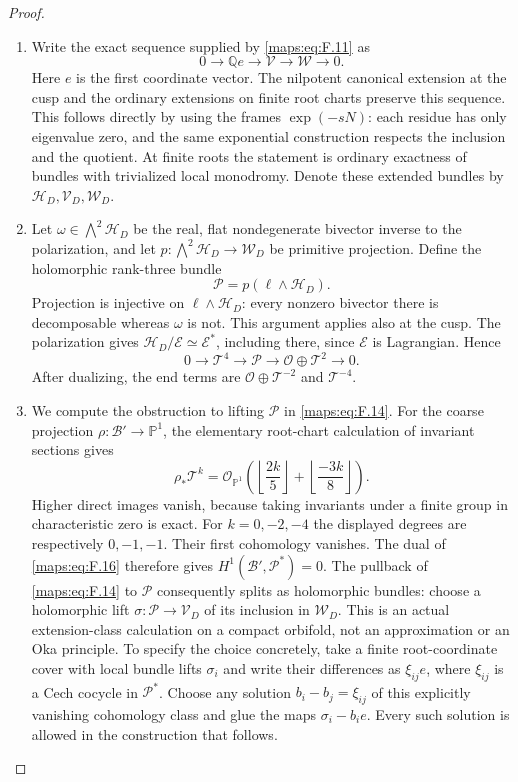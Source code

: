 \documentclass[11pt,a4paper]{article}
\theoremstyle{definition}
\begin{document}
\begin{proof}
\begin{enumerate}[label=\arabic*.]
\item Write the exact sequence supplied by \eqref{maps:eq:F.11} as
\[
 0\longrightarrow\mathbb Q e\longrightarrow\mathcal V
   \longrightarrow\mathcal W\longrightarrow0.
 \tag{F.14}\label{maps:eq:F.14}
\]
Here $e$ is the first coordinate vector.  The nilpotent canonical
extension at the cusp and the ordinary extensions on finite root
charts preserve this sequence.  This follows directly by using
the frames $\exp(-sN)$: each residue has only eigenvalue zero,
and the same exponential construction respects the inclusion and
the quotient.  At finite roots the statement is ordinary exactness
of bundles with trivialized local monodromy.  Denote these extended
bundles by $\mathcal H_D,\mathcal V_D,\mathcal W_D$.

\item Let $\omega\in\bigwedge^2\mathcal H_D$ be the real, flat
nondegenerate bivector inverse to the polarization, and let
$p:\bigwedge^2\mathcal H_D\to\mathcal W_D$ be primitive projection.
Define the holomorphic rank-three bundle
\[
 \mathcal P=p(\ell\wedge\mathcal H_D).
 \tag{F.15}\label{maps:eq:F.15}
\]
Projection is injective on $\ell\wedge\mathcal H_D$: every
nonzero bivector there is decomposable whereas $\omega$ is not.
This argument applies also at the cusp.  The polarization gives
$\mathcal H_D/\mathcal E\simeq\mathcal E^*$, including there,
since $\mathcal E$ is Lagrangian.  Hence
\[
 0\longrightarrow\mathcal T^4\longrightarrow\mathcal P
 \longrightarrow\mathcal O\oplus\mathcal T^2\longrightarrow0.
 \tag{F.16}\label{maps:eq:F.16}
\]
After dualizing, the end terms are
$\mathcal O\oplus\mathcal T^{-2}$ and $\mathcal T^{-4}$.

\item We compute the obstruction to lifting $\mathcal P$ in \eqref{maps:eq:F.14}.
For the coarse projection $\rho:\mathcal B'\to\mathbb P^1$,
the elementary root-chart calculation of invariant sections gives
\[
 \rho_*\mathcal T^k=
 \mathcal O_{\mathbb P^1}
 \left(\left\lfloor\frac{2k}{5}\right\rfloor+
       \left\lfloor\frac{-3k}{8}\right\rfloor\right).
 \tag{F.17}\label{maps:eq:F.17}
\]
Higher direct images vanish, because taking invariants under a
finite group in characteristic zero is exact.  For $k=0,-2,-4$
the displayed degrees are respectively $0,-1,-1$.  Their first
cohomology vanishes.  The dual of \eqref{maps:eq:F.16} therefore gives
$H^1(\mathcal B',\mathcal P^*)=0$.
The pullback of \eqref{maps:eq:F.14} to $\mathcal P$ consequently splits as
holomorphic bundles: choose a holomorphic lift
$\sigma:\mathcal P\to\mathcal V_D$ of its inclusion in
$\mathcal W_D$.  This is an actual extension-class calculation
on a compact orbifold, not an approximation or an Oka principle.
To specify the choice concretely, take a finite root-coordinate
cover with local bundle lifts $\sigma_i$ and write their
differences as $\xi_{ij}e$, where
$\xi_{ij}$ is a Cech cocycle in $\mathcal P^*$.
Choose any solution $b_i-b_j=\xi_{ij}$ of this explicitly
vanishing cohomology class and glue the maps
$\sigma_i-b_ie$.  Every such solution is allowed in the
construction that follows.


\end{enumerate}
\end{proof}
\end{document}
